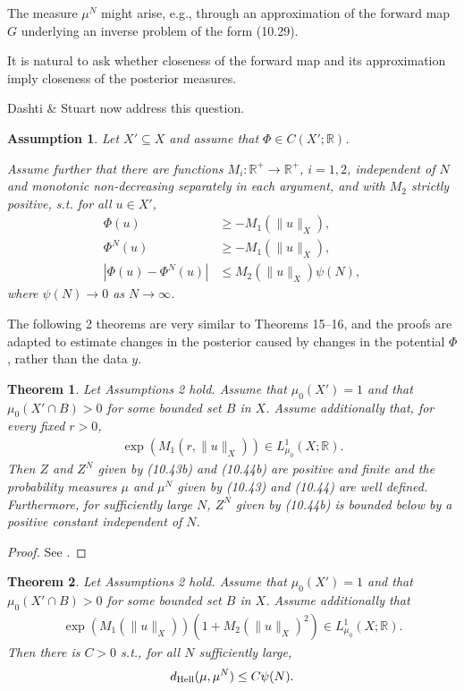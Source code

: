 \documentclass[oneside,11pt]{book}
\numberwithin{equation}{section}
\newtheorem{assumption}{Assumption}[section]
\newtheorem{theorem}{Theorem}[section]
\begin{document}
The measure $\mu^N$ might arise, e.g., through an approximation of the forward map $G$ underlying an inverse problem of the form (10.29).

It is natural to ask whether closeness of the forward map and its approximation imply closeness of the posterior measures.

Dashti \& Stuart now address this question.

\begin{assumption}
    Let $X'\subseteq X$ and assume that $\Phi\in C(X';\mathbb{R})$.
    
    Assume further that there are functions $M_i:\mathbb{R}^+\to\mathbb{R}^+$, $i = 1,2$, independent of $N$ and monotonic non-decreasing separately in each argument, and with $M_2$ strictly positive, s.t. for all $u\in X'$,
    \begin{align*}
        \Phi(u)&\ge -M_1(\|u\|_X),\\
        \Phi^N(u)&\ge -M_1(\|u\|_X),\\
        |\Phi(u) - \Phi^N(u)|&\le M_2(\|u\|_X)\psi(N),
    \end{align*}
    where $\psi(N)\to 0$ as $N\to\infty$.
\end{assumption}
The following 2 theorems are very similar to Theorems 15--16, and the proofs are adapted to estimate changes in the posterior caused by changes in the potential $\Phi$, rather than the data $y$.

\begin{theorem}
    Let Assumptions 2 hold. Assume that $\mu_0(X') = 1$ and that $\mu_0(X'\cap B) > 0$ for some bounded set $B$ in $X$. Assume additionally that, for every fixed $r > 0$,
    \begin{align*}
        \exp(M_1(r,\|u\|_X))\in L_{\mu_0}^1(X;\mathbb{R}).
    \end{align*}
    Then $Z$ and $Z^N$ given by (10.43b) and (10.44b) are positive and finite and the probability measures $\mu$ and $\mu^N$ given by (10.43) and (10.44) are well defined. Furthermore, for sufficiently large $N$, $Z^N$ given by (10.44b) is bounded below by a positive constant independent of $N$.
\end{theorem}

\begin{proof}
    See \cite[pp. 355--356]{Dashti_Stuart2017}.
\end{proof}

\begin{theorem}
    Let Assumptions 2 hold. Assume that $\mu_0(X') = 1$ and that $\mu_0(X'\cap B) > 0$ for some bounded set $B$ in $X$. Assume additionally that
    \begin{align*}
        \exp(M_1(\|u\|_X))\left(1 + M_2(\|u\|_X)^2\right)\in L_{\mu_0}^1(X;\mathbb{R}).
    \end{align*}
    Then there is $C > 0$ s.t., for all $N$ sufficiently large,
    \begin{align*}
        d_{\rm Hell}(\mu,\mu^N)\le C\psi(N).
    \end{align*}
\end{theorem}
\end{document}
